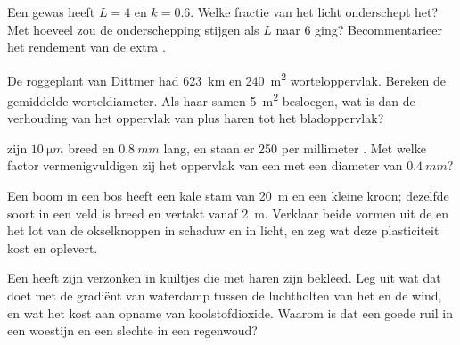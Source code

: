 \begin{exercise}[$\star\star$]\label{exo:b1:flowering-plant-organization:7}
Een gewas heeft $L = 4$ en $k = 0.6$. Welke fractie van het licht onderschept
het? Met hoeveel zou de onderschepping stijgen als $L$ naar 6 ging? Becommentarieer
het rendement van de extra .
\end{exercise}

\begin{exercise}[$\star\star$]\label{exo:b1:flowering-plant-organization:8}
De roggeplant van Dittmer had \qty{623}{km}  en \qty{240}{m^2}
worteloppervlak. Bereken de gemiddelde worteldiameter. Als haar  samen
\qty{5}{m^2} besloegen, wat is dan de verhouding van het oppervlak van 
plus haren tot het bladoppervlak?
\end{exercise}

\begin{exercise}[$\star\star$]\label{exo:b1:flowering-plant-organization:9}
 zijn $\qty{10}{\micro m}$ breed en $\qty{0.8}{mm}$ lang, en staan
er \qty{250}{} per millimeter . Met welke factor vermenigvuldigen zij het
oppervlak van een  met een diameter van $\qty{0.4}{mm}$?
\end{exercise}

\begin{exercise}[$\star\star\star$]\label{exo:b1:flowering-plant-organization:10}
Een boom in een bos heeft een kale stam van \qty{20}{m} en een kleine kroon;
dezelfde soort in een veld is breed en vertakt vanaf \qty{2}{m}. Verklaar beide
vormen uit de  en het lot van de okselknoppen in schaduw en in
licht, en zeg wat deze plasticiteit kost en oplevert.
\end{exercise}

\begin{exercise}[$\star\star\star$]\label{exo:b1:flowering-plant-organization:11}
Een  heeft zijn  verzonken in kuiltjes die met haren zijn
bekleed. Leg uit wat dat doet met de gradiënt van waterdamp tussen de
luchtholten van het  en de wind, en wat het kost aan opname van
koolstofdioxide. Waarom is dat een goede ruil in een woestijn en een slechte in
een regenwoud?
\end{exercise}

